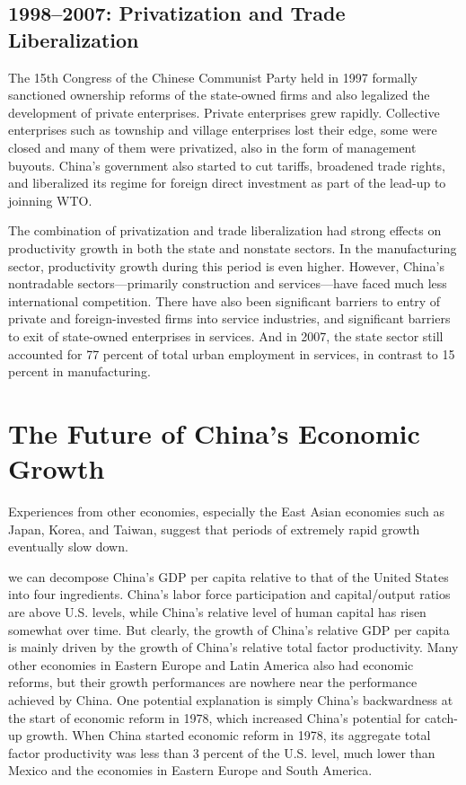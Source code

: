 \documentclass{article}
\begin{document}
    \subsection*{1998–2007: Privatization and Trade Liberalization}
    The 15th Congress of the Chinese Communist Party held in 1997 formally sanctioned ownership reforms of the state-owned firms and also legalized the development of private enterprises.  Private enterprises grew rapidly. Collective enterprises such as township and village enterprises lost their edge, some were closed and many of them were privatized, also in the form of management buyouts. China’s government also started to cut tariffs, broadened trade rights, and liberalized its regime for foreign direct investment as part of the lead-up to joinning WTO.

    The combination of privatization and trade liberalization had strong effects on productivity growth in both the state and nonstate sectors. In the manufacturing sector, productivity growth during this period is even higher. However, China’s nontradable sectors—primarily construction and services—have faced much less international competition. There have also been significant barriers to entry of private and foreign-invested firms into service industries, and significant barriers to exit of state-owned enterprises in services. And in 2007, the state sector still accounted for 77 percent of total urban employment in services, in contrast to 15 percent in manufacturing. 

    \section*{The Future of China’s Economic Growth}
    Experiences from other economies, especially the East Asian economies such as Japan, Korea, and Taiwan, suggest that periods of extremely rapid growth eventually slow down.

    we can decompose China’s GDP per capita relative to that of the United States into four ingredients. China’s labor force participation and capital/output ratios are above U.S. levels, while China’s relative level of human capital has risen somewhat over time. But clearly, the growth of China’s relative GDP per capita is mainly driven by the growth of China’s relative total factor productivity. Many other economies in Eastern Europe and Latin America also had economic reforms, but their growth performances are nowhere near the performance achieved by China. One potential explanation is simply China’s backwardness at the start of economic reform in 1978, which increased China’s potential for catch-up growth. When China started economic reform in 1978, its aggregate total factor productivity was less than 3 percent of the U.S. level, much lower than Mexico and the economies in Eastern Europe and South America. 
\end{document}
